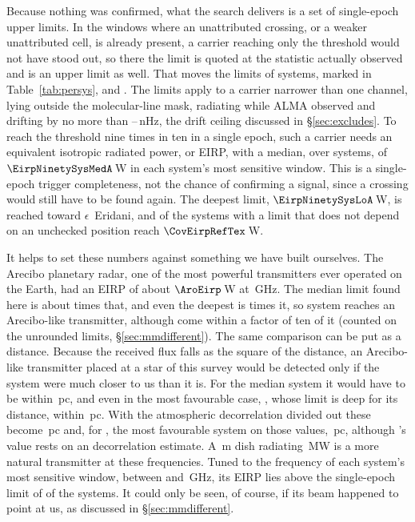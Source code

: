 Because nothing was confirmed, what the search delivers is a set of
single-epoch upper limits. In the \XwNWin{} windows where an unattributed
crossing, or a weaker unattributed cell, is already present, a carrier
reaching only the threshold would not have stood out, so there the limit is
quoted at the statistic actually observed and is an upper limit as well. That moves the limits of \XwNSysWord{} systems, marked in
Table~\ref{tab:persys}, and \XwHeadlineClause. The limits apply to a
carrier narrower than one channel, lying outside the molecular-line mask,
radiating while ALMA observed and drifting by no more than
\DriftCeilLo--\DriftCeilHi\,nHz, the drift ceiling discussed in
\S\ref{sec:excludes}. To reach the threshold nine times in ten in a single
epoch, such a carrier needs an equivalent isotropic radiated power, or EIRP,
with a median, over systems, of $\EirpNinetySysMedA$\,W in each system's
most sensitive window. This is a single-epoch trigger completeness, not the
chance of confirming a signal, since a crossing would still have to be found
again. The deepest limit, $\EirpNinetySysLoA$\,W, is reached toward
$\epsilon$~Eridani, and \NSysEfifteen{} of the \NSysALimSum{} systems with a
limit that does not depend on an unchecked position reach
$\CovEirpRefTex$\,W.

It helps to set these numbers against something we have built ourselves.
The Arecibo planetary radar, one of the most powerful transmitters ever
operated on the Earth, had an EIRP of about $\AroEirp$\,W at
\AroFreqGHz\,GHz. The median limit found here is about \AroMedMult{} times
that, and even the deepest is \AroDeepMult{} times it, so
\AroNSysBelowWord{} system reaches an Arecibo-like transmitter, although
\AroNSysTen{} come within a factor of ten of it (counted on the unrounded
limits, \S\ref{sec:mmdifferent}). The same comparison can be
put as a distance. Because the received flux falls as the square of the
distance, an Arecibo-like transmitter placed at a star of this survey would
be detected only if the system were much closer to us than it is. For the
median system it would have to be within \AroDistMedPc\,pc, and even in the
most favourable case, \AroDistMaxStar, whose limit is deep for its distance,
within \AroDistMaxPc\,pc. With the atmospheric decorrelation divided out
these become \AroDistMedPcDec\,pc and, for \AroDistMaxStarDec, the most
favourable system on those values, \AroDistMaxPcDec\,pc, although \AroDistMaxStarDec's value rests on an
\AroDistMaxDecBasis{} decorrelation estimate. A \BenchDiam\,m dish radiating \BenchPowerMW\,MW is
a more natural transmitter at these frequencies. Tuned to the frequency of
each system's most sensitive window, between \BenchTunedFreqLo{} and
\BenchTunedFreqHi\,GHz, its EIRP lies above the single-epoch limit of
\BenchNSysTuned{} of the \NSysALimSum{} systems. It could only be seen, of
course, if its beam happened to point at us, as discussed in
\S\ref{sec:mmdifferent}.


